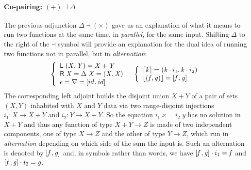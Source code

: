 \documentclass{elsarticle}
\newcommand{\Conid}[1]{\mathit{#1}}
\newcommand{\Varid}[1]{\mathit{#1}}
\newenvironment{lcbr}{\left\{\begin{array}{l}}{\end{array}\right.}
\def\alt#1#2{\mathopen{[}#1\hskip 1pt,#2\mathclose{]}}
\def\comp{ \mathbin{\cdot} }
\def\fun#1{\mathsf{#1}}
\begin{document}
\paragraph{Co-pairing: \ensuremath{(\mathbin{+})\mathbin\dashv \Delta }} The previous adjunction \ensuremath{\Delta \mathbin\dashv ( \times )}
gave us an explanation of what it means to run two functions at the same time,
in \emph{parallel}, for the same input. Shifting \ensuremath{\Delta } to the right of
the \ensuremath{\mathbin\dashv } symbol will provide an explanation for the dual idea of running
two functions not in parallel, but in \emph{alternation}:
\begin{eqnarray}
	\ensuremath{\begin{lcbr}\fun L \;(\Conid{X},\Conid{Y})\mathrel{=}\Conid{X}\mathbin{+}\Conid{Y}\\\fun R \;\Conid{X}\mathrel{=}\Delta \;\Conid{X}\mathrel{=}(\Conid{X},\Conid{X})\\\epsilon \mathrel{=}\nabla \mathrel{=}\alt{{id}}{{id}}\end{lcbr}}
&&
	\ensuremath{\begin{lcbr}\lceil \Varid{k}\rceil\mathrel{=}(\Varid{k} \comp i_1,\Varid{k} \comp i_2)\\\lfloor (\Varid{f},\Varid{g})\rfloor\mathrel{=}\alt{\Varid{f}}{\Varid{g}}\end{lcbr}}
	\label{eq:230207a}
\end{eqnarray}
The corresponding left adjoint builds the disjoint union \ensuremath{\Conid{X}\mathbin{+}\Conid{Y}} of a pair of sets \ensuremath{(\Conid{X},\Conid{Y})}
inhabited with \ensuremath{\Conid{X}} and \ensuremath{\Conid{Y}} data via two range-disjoint injections \ensuremath{i_1\mathbin{:}\Conid{X}\to \Conid{X}\mathbin{+}\Conid{Y}}
and \ensuremath{i_2\mathbin{:}\Conid{Y}\to \Conid{X}\mathbin{+}\Conid{Y}}. So the equation \ensuremath{i_1\;\Varid{x}\mathrel{=}i_2\;\Varid{y}} has no solution in \ensuremath{\Conid{X}\mathbin{+}\Conid{Y}} and thus
any function of type \ensuremath{\Conid{X}\mathbin{+}\Conid{Y}\to \Conid{Z}} is made of two independent components,
one of type \ensuremath{\Conid{X}\to \Conid{Z}} and the other of type \ensuremath{\Conid{Y}\to \Conid{Z}}, which run in \emph{alternation}
depending on which side of the sum the input is. Such an alternation is denoted
by \ensuremath{\alt{\Varid{f}}{\Varid{g}}} and, in symbols rather than words, we have
\ensuremath{\alt{\Varid{f}}{\Varid{g}} \comp i_1\mathrel{=}\Varid{f}} and \ensuremath{\alt{\Varid{f}}{\Varid{g}} \comp i_2\mathrel{=}\Varid{g}}.
\end{document}
